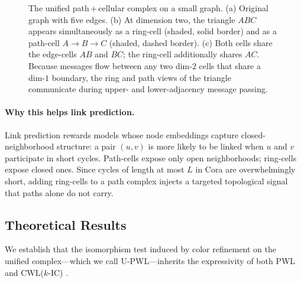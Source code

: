\documentclass[letterpaper]{article} %
\begin{document}
\begin{figure}[t]
    \caption{The unified path\,+\,cellular complex on a small graph. (a) Original graph with five edges. (b) At dimension two, the triangle \(ABC\) appears simultaneously as a ring-cell (shaded, solid border) and as a path-cell \(A{\to}B{\to}C\) (shaded, dashed border). (c) Both cells share the edge-cells \(AB\) and \(BC\); the ring-cell additionally shares \(AC\). Because messages flow between any two dim-\(2\) cells that share a dim-\(1\) boundary, the ring and path views of the triangle communicate during upper- and lower-adjacency message passing.}
    \label{fig:unified}
\end{figure}

\paragraph{Why this helps link prediction.} Link prediction rewards models whose node embeddings capture closed-neighborhood structure: a pair \((u, v)\) is more likely to be linked when \(u\) and \(v\) participate in short cycles. Path-cells expose only open neighborhoods; ring-cells expose closed ones. Since cycles of length at most \(L\) in Cora are overwhelmingly short, adding ring-cells to a path complex injects a targeted topological signal that paths alone do not carry.

\subsection{Theoretical Results} \label{subsec:theory}
We establish that the isomorphism test induced by color refinement on the unified complex---which we call U-PWL---inherits the expressivity of both PWL \cite{truong_weisfeiler_2024} and CWL(\(k\)-IC) \cite{bodnar_weisfeiler_2022}.
\end{document}
